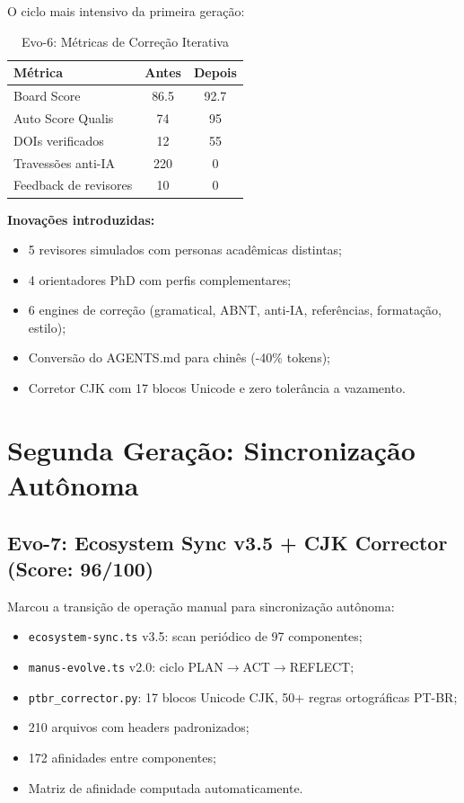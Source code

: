 \documentclass[12pt,a4paper,sumario=tradicional]{abntex2}
\begin{document}
O ciclo mais intensivo da primeira geração:

\begin{longtable}{@{}lcc@{}}
\caption{Evo-6: Métricas de Correção Iterativa}\\
\toprule
\textbf{Métrica} & \textbf{Antes} & \textbf{Depois} \\
\midrule
Board Score & 86.5 & 92.7 \\
Auto Score Qualis & 74 & 95 \\
DOIs verificados & 12 & 55 \\
Travessões anti-IA & 220 & 0 \\
Feedback de revisores & 10 & 0 \\
\bottomrule
\end{longtable}

\textbf{Inovações introduzidas:}
\begin{itemize}
    \item 5 revisores simulados com personas acadêmicas distintas;
    \item 4 orientadores PhD com perfis complementares;
    \item 6 engines de correção (gramatical, ABNT, anti-IA, referências, formatação, estilo);
    \item Conversão do AGENTS.md para chinês (-40\% tokens);
    \item Corretor CJK com 17 blocos Unicode e zero tolerância a vazamento.
\end{itemize}

\chapter{Segunda Geração: Sincronização Autônoma}

\section{Evo-7: Ecosystem Sync v3.5 + CJK Corrector (Score: 96/100)}

Marcou a transição de operação manual para sincronização autônoma:
\begin{itemize}
    \item \texttt{ecosystem-sync.ts} v3.5: scan periódico de 97 componentes;
    \item \texttt{manus-evolve.ts} v2.0: ciclo PLAN$\rightarrow$ACT$\rightarrow$REFLECT;
    \item \texttt{ptbr\_corrector.py}: 17 blocos Unicode CJK, 50+ regras ortográficas PT-BR;
    \item 210 arquivos com headers padronizados;
    \item 172 afinidades entre componentes;
    \item Matriz de afinidade computada automaticamente.
\end{itemize}
\end{document}
